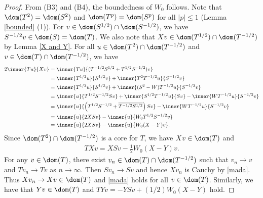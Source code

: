 \documentclass[12pt]{article}
\theoremstyle{plain}
\numberwithin{equation}{section}
\theoremstyle{remark}
\begin{document}
\begin{proof}
From (B3) and (B4), the boundedness of $W_0$ follows.
Note that $\dom(T^2)=\dom(S^2)$ and $\dom(T^p)=\dom(S^p)$ for all $|p|\leq 1$ (Lemma \ref{bounded} (1)).
For $v\in\dom(S^{1/2})\cap \dom(S^{-1/2})$, we have $S^{-1/2}v \in \dom(S)=\dom(T)$.
We also note that $Xv\in\dom(T^{1/2})\cap\dom(T^{-1/2})$ by Lemma \ref{X and Y}. 
For all $u\in \dom(T^2)\cap\dom(T^{-1/2})$ and $v \in \dom(T)\cap\dom(T^{-1/2})$, we have
\begin{align*}
  2\inner{Tu}{Xv} 
& = \inner{Tu}{(T^{-1/2}S^{1/2}+T^{1/2}S^{-1/2})v} \\
& = \inner{T^{1/2}u}{S^{1/2}v} + \inner{T^2T^{-1/2}u}{S^{-1/2}v} \\
& = \inner{T^{1/2}u}{S^{1/2}v} + \inner{(S^2-W)T^{-1/2}u}{S^{-1/2}v} \\
& = \inner{u}{T^{1/2}S^{-1/2}Sv} + \inner{S^{1/2}T^{-1/2}u}{Sv} - \inner{WT^{-1/2}u}{S^{-1/2}v} \\
& = \inner{u}{\left(T^{1/2}S^{-1/2}+\overline{T^{-1/2}S^{1/2}}\right)Sv} - \inner{WT^{-1/2}u}{S^{-1/2}v} \\
& = \inner{u}{2XSv} - \inner{u}{W_0T^{1/2}S^{-1/2}v} \\
& = \inner{u}{2XSv} - \inner{u}{W_0(X-Y)v}.
\end{align*}
Since $\dom(T^2)\cap\dom(T^{-1/2})$ is a core for $T$, we have $Xv\in\dom(T)$ and 
\begin{align}
  TXv = XSv - \frac{1}{2}W_0(X-Y)v.  \label{mada}
\end{align}
For any $v\in\dom(T)$, there exist $v_n \in \dom(T)\cap \dom(T^{-1/2})$ such that 
$v_n\to v$ and $Tv_n\to Tv$ as $n\to\infty$. Then $Sv_n\to Sv$ and hence
$Xv_n$ is Cauchy by \eqref{mada}. Thus $Xv_n\to Xv\in\dom(T)$ and
\eqref{mada} holds for all $v\in\dom(T)$.
Similarly, we have that $Yv\in\dom(T)$ and $TYv=-YSv+(1/2)W_0(X-Y)$ hold.
\end{proof}
\end{document}
